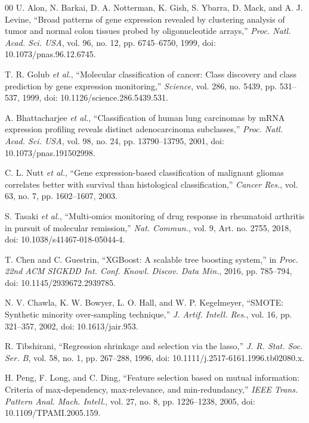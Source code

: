 \documentclass[journal]{IEEEtran}
\begin{document}
\begin{thebibliography}{00}
 U. Alon, N. Barkai, D. A. Notterman, K. Gish, S. Ybarra, D. Mack, and A. J. Levine, ``Broad patterns of gene expression revealed by clustering analysis of tumor and normal colon tissues probed by oligonucleotide arrays,'' \textit{Proc. Natl. Acad. Sci. USA}, vol. 96, no. 12, pp. 6745--6750, 1999, doi: 10.1073/pnas.96.12.6745.

 T. R. Golub \textit{et al.}, ``Molecular classification of cancer: Class discovery and class prediction by gene expression monitoring,'' \textit{Science}, vol. 286, no. 5439, pp. 531--537, 1999, doi: 10.1126/science.286.5439.531.

 A. Bhattacharjee \textit{et al.}, ``Classification of human lung carcinomas by mRNA expression profiling reveals distinct adenocarcinoma subclasses,'' \textit{Proc. Natl. Acad. Sci. USA}, vol. 98, no. 24, pp. 13790--13795, 2001, doi: 10.1073/pnas.191502998.

 C. L. Nutt \textit{et al.}, ``Gene expression-based classification of malignant gliomas correlates better with survival than histological classification,'' \textit{Cancer Res.}, vol. 63, no. 7, pp. 1602--1607, 2003.

 S. Tasaki \textit{et al.}, ``Multi-omics monitoring of drug response in rheumatoid arthritis in pursuit of molecular remission,'' \textit{Nat. Commun.}, vol. 9, Art. no. 2755, 2018, doi: 10.1038/s41467-018-05044-4.

 T. Chen and C. Guestrin, ``XGBoost: A scalable tree boosting system,'' in \textit{Proc. 22nd ACM SIGKDD Int. Conf. Knowl. Discov. Data Min.}, 2016, pp. 785--794, doi: 10.1145/2939672.2939785.

 N. V. Chawla, K. W. Bowyer, L. O. Hall, and W. P. Kegelmeyer, ``SMOTE: Synthetic minority over-sampling technique,'' \textit{J. Artif. Intell. Res.}, vol. 16, pp. 321--357, 2002, doi: 10.1613/jair.953.

 R. Tibshirani, ``Regression shrinkage and selection via the lasso,'' \textit{J. R. Stat. Soc. Ser. B}, vol. 58, no. 1, pp. 267--288, 1996, doi: 10.1111/j.2517-6161.1996.tb02080.x.

 H. Peng, F. Long, and C. Ding, ``Feature selection based on mutual information: Criteria of max-dependency, max-relevance, and min-redundancy,'' \textit{IEEE Trans. Pattern Anal. Mach. Intell.}, vol. 27, no. 8, pp. 1226--1238, 2005, doi: 10.1109/TPAMI.2005.159.


\end{thebibliography}
\end{document}
